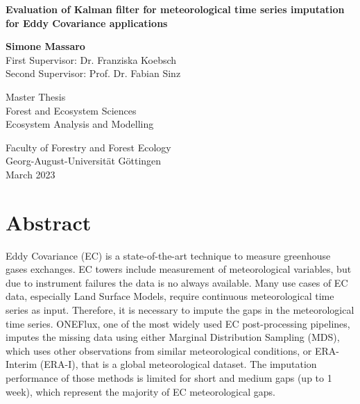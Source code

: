 \documentclass{article}
\let\Oldsection\section
\renewcommand{\section}{\FloatBarrier\Oldsection}
\begin{document}
\begin{titlepage}
    \begin{center}
        \vspace*{1cm}
            
        \Huge
        \textbf{Evaluation of Kalman filter for meteorological time series imputation for Eddy Covariance applications}
            
        \vspace{0.5cm}
        \LARGE
            
        \vspace{1.5cm}
            
        \textbf{Simone Massaro} \\
        \vspace{1cm}
        First Supervisor: Dr. Franziska Koebsch\\
        Second Supervisor: Prof. Dr. Fabian Sinz 
        \vfill
            
        Master Thesis\\
        Forest and Ecosystem Sciences\\
        Ecosystem Analysis and Modelling
            
        \vspace{0.8cm}
            
        \Large
        Faculty of Forestry and Forest Ecology \\
        Georg-August-Universität Göttingen \\
        \vspace{0.3cm}
        March 2023
            
    \end{center}
\end{titlepage}
\clearpage

\section*{Abstract}

Eddy Covariance (EC) is a state-of-the-art technique to measure greenhouse gases exchanges. EC towers include measurement of meteorological variables, but due to instrument failures the data is no always available. Many use cases of EC data, especially Land Surface Models, require continuous meteorological time series as input. Therefore, it is necessary to impute the gaps in the meteorological time series. ONEFlux, one of the most widely used EC post-processing pipelines, imputes the missing data using either Marginal Distribution Sampling (MDS), which uses other observations from similar meteorological conditions, or ERA-Interim (ERA-I), that is a global meteorological dataset. The imputation performance of those methods is limited for short and medium gaps (up to 1 week), which represent the majority of EC meteorological gaps.
\end{document}

